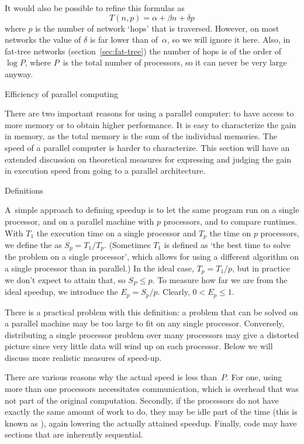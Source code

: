 It would also be possible to refine this formulas as
\[ T(n,p) = \alpha+\beta n+\delta p \]
where $p$ is the number of network `hops' that is traversed. However,
on most networks the value of $\delta$ is far lower than of~$\alpha$,
so we will ignore it here. Also, in fat-tree networks
(section~\ref{sec:fat-tree}) the number of hops is of the order of
$\log P$, where $P$~is the total number of processors, so it can never
be very large anyway.

 {Efficiency of parallel computing}

There are two important reasons for using a parallel computer: to have
access to more memory or to obtain higher performance. It is easy to
characterize the gain in memory, as the total memory is the sum of the
individual memories. The speed of a parallel computer is harder to
characterize. This section will have an extended discussion on
theoretical measures for expressing and judging the gain in execution
speed from going to a parallel architecture.

 {Definitions}

A~simple approach to defining speedup is to let the same program run on a
single processor, and on a parallel machine with $p$ processors, and
to compare runtimes.
With $T_1$ the execution time on a single processor and
$T_p$ the time on $p$ processors, we define the  as
$S_p=T_1/T_p$. (Sometimes $T_1$ is defined as `the best time to solve the
problem on a single processor', which allows for using a different
algorithm on a single processor than in parallel.)
In the ideal case, $T_p=T_1/p$, but in practice we don't expect to
attain that, so $S_P\leq p$. To measure how far we are from the ideal
speedup, we introduce the  $E_p=S_p/p$. Clearly,
$0< E_p\leq 1$.

There is a practical problem with
this definition: a problem that can be solved on a parallel machine
may be too large to fit on any single processor. Conversely,
distributing a single processor problem
over many processors may give a distorted picture since very little
data will wind up on each processor. Below we will discuss more
realistic measures of speed-up.

There are various reasons why the actual speed is less than~$P$. For
one, using more than one processors necessitates communication, which
is overhead that was not part of the original computation. Secondly,
if the processors do not have exactly the same amount of work to do,
they may be idle part of the time (this is known as
), again lowering the actually attained
speedup. Finally, code may have sections that are inherently
sequential.

